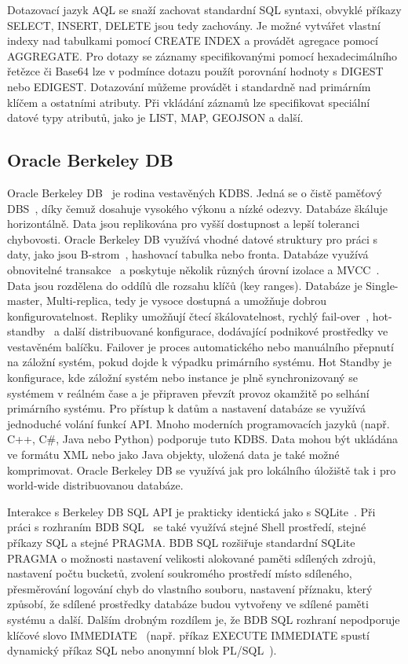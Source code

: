 \documentclass[czech,master,dept460,male,csharp,cpdeclaration]{diploma}
\begin{document}
	Dotazovací jazyk AQL se snaží zachovat standardní SQL syntaxi, obvyklé příkazy SELECT, INSERT, DELETE jsou tedy zachovány. Je možné vytvářet vlastní indexy nad tabulkami pomocí CREATE INDEX a provádět agregace pomocí AGGREGATE. Pro dotazy se záznamy specifikovanými pomocí hexadecimálního řetězce či Base64 lze v podmínce dotazu použít porovnání hodnoty s DIGEST nebo EDIGEST. Dotazování můžeme provádět i standardně nad primárním klíčem a ostatními atributy. Při vkládání záznamů lze specifikovat speciální datové typy atributů, jako je LIST, MAP, GEOJSON a další.
	
	\subsection{Oracle Berkeley DB} \label{lab-oracle-berkleydb}
	
	Oracle Berkeley DB~\cite{berkeleydb} je rodina vestavěných KDBS. Jedná se o čistě paměťový DBS~\cite{inmemory}, díky čemuž dosahuje vysokého výkonu a nízké odezvy. Databáze škáluje horizontálně. Data jsou replikována pro vyšší dostupnost a lepší toleranci chybovosti. Oracle Berkeley DB využívá vhodné datové struktury pro práci s daty, jako jsou B-strom~\cite{btree}, hashovací tabulka nebo fronta. Databáze využívá obnovitelné transakce~\cite{acid} a poskytuje několik různých úrovní izolace a MVCC~\cite{mvcc}. Data jsou rozdělena do oddílů dle rozsahu klíčů (key ranges). Databáze je Single-master, Multi-replica, tedy je vysoce dostupná a umožňuje dobrou konfigurovatelnost. Repliky umožňují čtecí škálovatelnost, rychlý fail-over~\cite{failover}, hot-standby~\cite{hotstandby} a další distribuované konfigurace, dodávající podnikové prostředky ve vestavěném balíčku. Failover je proces automatického nebo manuálního přepnutí na záložní systém, pokud dojde k výpadku primárního systému. Hot Standby je konfigurace, kde záložní systém nebo instance je plně synchronizovaný se systémem v reálném čase a je připraven převzít provoz okamžitě po selhání primárního systému. Pro přístup k datům a nastavení databáze se využívá jednoduché volání funkcí API. Mnoho moderních programovacích jazyků (např. C++, C\#, Java nebo Python) podporuje tuto KDBS. Data mohou být ukládána ve formátu XML nebo jako Java objekty, uložená data je také možné komprimovat. Oracle Berkeley DB se využívá jak pro lokálního úložiště tak i pro world-wide distribuovanou databáze.
	
	Interakce s Berkeley DB SQL API je prakticky identická jako s SQLite~\cite{sqlite}. Při práci s rozhraním BDB SQL~\cite{bdbsql} se také využívá stejné Shell prostředí, stejné příkazy SQL a stejné PRAGMA. BDB SQL rozšiřuje standardní SQLite PRAGMA o možnosti nastavení velikosti alokované paměti sdílených zdrojů, nastavení počtu bucketů, zvolení soukromého prostředí místo sdíleného, přesměrování logování chyb do vlastního souboru, nastavení příznaku, který způsobí, že sdílené prostředky databáze budou vytvořeny ve sdílené paměti systému a další. Dalším drobným rozdílem je, že BDB SQL rozhraní nepodporuje klíčové slovo IMMEDIATE~\cite{oracle-immediate} (např. příkaz EXECUTE IMMEDIATE spustí dynamický příkaz SQL nebo anonymní blok PL/SQL~\cite{pl-sql}).
	
\end{document}
